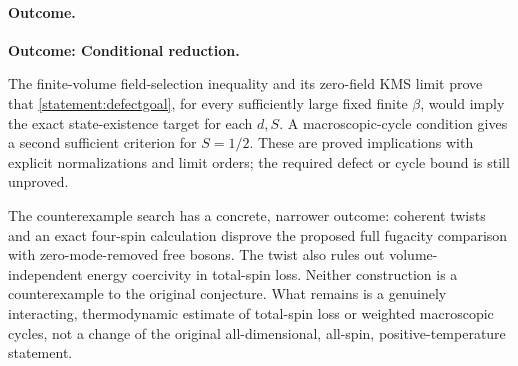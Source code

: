\documentclass[11pt]{article}
\begin{document}
	\paragraph{Outcome.}
	\textbf{Outcome: Conditional reduction.}
	
	The finite-volume field-selection inequality and its zero-field KMS
	limit prove that \eqref{statement:defectgoal}, for every sufficiently large
	fixed finite $\beta$, would imply the exact state-existence target for
	each $d,S$. A macroscopic-cycle condition gives a second sufficient
	criterion for $S=1/2$. These are proved implications with explicit
	normalizations and limit orders; the required defect or cycle bound
	is still unproved.
	
	The counterexample search has a concrete, narrower outcome: coherent
	twists and an exact four-spin calculation disprove the proposed full
	fugacity comparison with zero-mode-removed free bosons. The twist also
	rules out volume-independent energy coercivity in total-spin loss.
	Neither construction is a counterexample to the original conjecture.
	What remains is a genuinely interacting, thermodynamic estimate of
	total-spin loss or weighted macroscopic cycles, not a change of the
	original all-dimensional, all-spin, positive-temperature statement.
\end{document}
